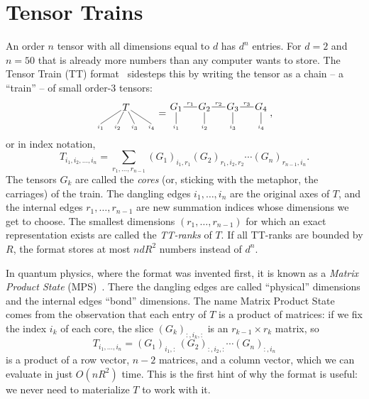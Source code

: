 
\chapter{Tensor Trains}
\label{chapter:tt}

An order $n$ tensor with all dimensions equal to $d$ has $d^n$ entries.
For $d=2$ and $n=50$ that is already more numbers than any computer wants to store.
The Tensor Train (TT) format~\cite{oseledets_tt} sidesteps this by writing the tensor as a chain -- a ``train'' -- of small order-3 tensors:
\[
   \begin{tikzpicture}[baseline=-.9em, inner sep=1pt]
      \node (T) at (0,0) {$T$};
      \draw (T) -- ++(-.9,-.6) node[pos=1, below, font=\tiny] {$i_1$};
      \draw (T) -- ++(-.3,-.6) node[pos=1, below, font=\tiny] {$i_2$};
      \draw (T) -- ++(.3,-.6) node[pos=1, below, font=\tiny] {$i_3$};
      \draw (T) -- ++(.9,-.6) node[pos=1, below, font=\tiny] {$i_4$};
   \end{tikzpicture}
   =
   \begin{tikzpicture}[baseline=-.9em, inner sep=1pt]
      \node (G1) at (0,0) {$G_1$};
      \node (G2) at (1,0) {$G_2$};
      \node (G3) at (2,0) {$G_3$};
      \node (G4) at (3,0) {$G_4$};
      \draw (G1) -- (G2) node[midway, above, font=\tiny] {$r_1$};
      \draw (G2) -- (G3) node[midway, above, font=\tiny] {$r_2$};
      \draw (G3) -- (G4) node[midway, above, font=\tiny] {$r_3$};
      \draw (G1) -- ++(0,-.6) node[pos=1, below, font=\tiny] {$i_1$};
      \draw (G2) -- ++(0,-.6) node[pos=1, below, font=\tiny] {$i_2$};
      \draw (G3) -- ++(0,-.6) node[pos=1, below, font=\tiny] {$i_3$};
      \draw (G4) -- ++(0,-.6) node[pos=1, below, font=\tiny] {$i_4$};
   \end{tikzpicture}
   \,,
\]
or in index notation,
\[
   T_{i_1,i_2,\dots,i_n}
   = \sum_{r_1, \dots, r_{n-1}}
   (G_1)_{i_1,r_1} (G_2)_{r_1,i_2,r_2} \cdots (G_n)_{r_{n-1},i_n}
   .
\]
The tensors $G_k$ are called the \emph{cores} (or, sticking with the metaphor, the carriages) of the train.
The dangling edges $i_1,\dots,i_n$ are the original axes of $T$,
and the internal edges $r_1,\dots,r_{n-1}$ are new summation indices whose dimensions we get to choose.
The smallest dimensions $(r_1,\dots,r_{n-1})$ for which an exact representation exists are called the \emph{TT-ranks} of $T$.
If all TT-ranks are bounded by $R$, the format stores at most $n d R^2$ numbers instead of $d^n$.

In quantum physics, where the format was invented first, it is known as a \emph{Matrix Product State} (MPS)~\cite{vidal_mps, schollwock_mps}.
There the dangling edges are called ``physical'' dimensions and the internal edges ``bond'' dimensions.
The name Matrix Product State comes from the observation that each entry of $T$ is a product of matrices:
if we fix the index $i_k$ of each core, the slice $(G_k)_{:,i_k,:}$ is an $r_{k-1}\times r_k$ matrix, so
\[
   T_{i_1,\dots,i_n} = (G_1)_{i_1,:}\, (G_2)_{:,i_2,:} \cdots (G_n)_{:,i_n}
\]
is a product of a row vector, $n-2$ matrices, and a column vector,
which we can evaluate in just $O(n R^2)$ time.
This is the first hint of why the format is useful:
we never need to materialize $T$ to work with it.

